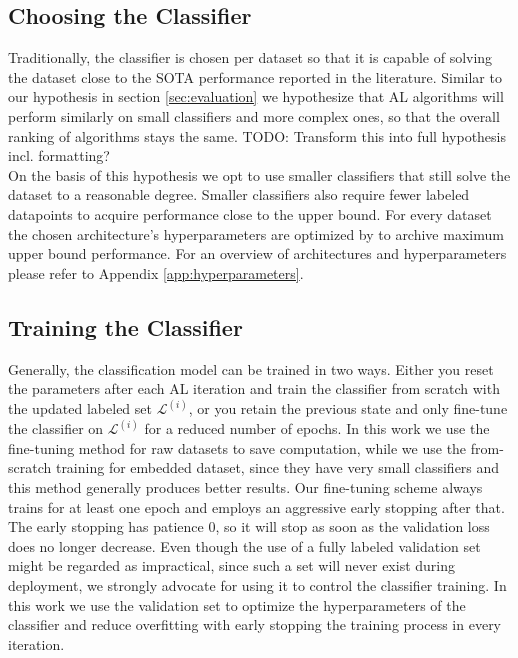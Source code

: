 \documentclass[]{article}
\begin{document}
\subsection{Choosing the Classifier}\label{sec:choosing_the_classifier}
Traditionally, the classifier is chosen per dataset so that it is capable of solving the dataset close to the SOTA performance reported in the literature.
Similar to our hypothesis in section \ref{sec:evaluation} we hypothesize that AL algorithms will perform similarly on small classifiers and more complex ones, so that the overall ranking of algorithms stays the same.
{\color{red} TODO: Transform this into full hypothesis incl. formatting?}\\
On the basis of this hypothesis we opt to use smaller classifiers that still solve the dataset to a reasonable degree.
Smaller classifiers also require fewer labeled datapoints to acquire performance close to the upper bound.
For every dataset the chosen architecture's hyperparameters are optimized by to archive maximum upper bound performance.
For an overview of architectures and hyperparameters please refer to Appendix \ref{app:hyperparameters}.


\subsection{Training the Classifier}\label{sec:training_the_classifier}
Generally, the classification model can be trained in two ways. Either you reset the parameters after each AL iteration and train the classifier from scratch with the updated labeled set $\mathcal{L}^{(i)}$, or you retain the previous state and only fine-tune the classifier on $\mathcal{L}^{(i)}$ for a reduced number of epochs.
In this work we use the fine-tuning method for raw datasets to save computation, while we use the from-scratch training for embedded dataset, since they have very small classifiers and this method generally produces better results.
Our fine-tuning scheme always trains for at least one epoch and employs an aggressive early stopping after that.
The early stopping has patience 0, so it will stop as soon as the validation loss does no longer decrease.
Even though the use of a fully labeled validation set might be regarded as impractical, since such a set will never exist during deployment, we strongly advocate for using it to control the classifier training.
In this work we use the validation set to optimize the hyperparameters of the classifier and reduce overfitting with early stopping the training process in every iteration.
\end{document}
